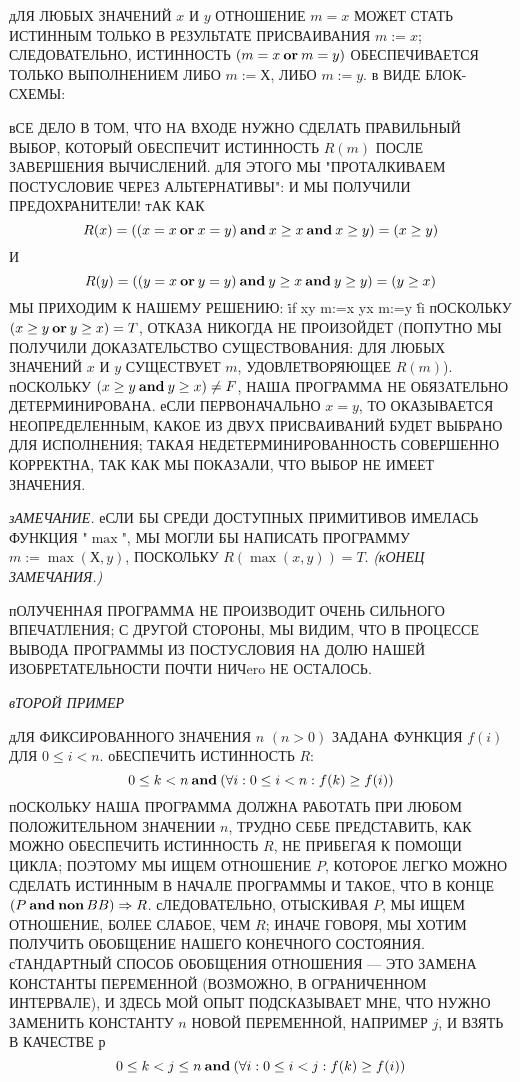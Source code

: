 дЛЯ ЛЮБЫХ ЗНАЧЕНИЙ $x$ И $y$ ОТНОШЕНИЕ $m=x$ МОЖЕТ СТАТЬ ИСТИННЫМ 
ТОЛЬКО В РЕЗУЛЬТАТЕ ПРИСВАИВАНИЯ $m:=x$; СЛЕДОВАТЕЛЬНО, ИСТИННОСТЬ 
$(m=x \mathbin{\bf or} m=y)$ ОБЕСПЕЧИВАЕТСЯ ТОЛЬКО ВЫПОЛНЕНИЕМ ЛИБО $m:=Х$, ЛИБО 
$m:=y$. в ВИДЕ БЛОК-СХЕМЫ:

вСЕ ДЕЛО В ТОМ, ЧТО НА ВХОДЕ НУЖНО СДЕЛАТЬ ПРАВИЛЬНЫЙ ВЫБОР, 
КОТОРЫЙ ОБЕСПЕЧИТ ИСТИННОСТЬ $R(m)$ ПОСЛЕ ЗАВЕРШЕНИЯ ВЫЧИСЛЕНИЙ. 
дЛЯ ЭТОГО МЫ "ПРОТАЛКИВАЕМ ПОСТУСЛОВИЕ ЧЕРЕЗ АЛЬТЕРНАТИВЫ":
И МЫ ПОЛУЧИЛИ ПРЕДОХРАНИТЕЛИ! тАК КАК 
$$ 
R(x) = ((x=x \mathbin{\bf or} x=y) \mathbin{\bf and} x\ge x \mathbin{\bf and} x\ge y) = (x\ge y) 
$$ 
 И
$$ 
R(y)= ((y=x \mathbin{\bf or} y=y) \mathbin{\bf and} y \ge x \mathbin{\bf and} y\ge y) = (y \ge x) 
$$ 
МЫ ПРИХОДИМ К НАШЕМУ РЕШЕНИЮ: 
\prg 
\.{if} x\ge y \to m:=x \wbox y\ge x \to m:=y \.{fi}
\grp
пОСКОЛЬКУ $(x\ge y \mathbin{\bf or} y \ge x)=T$, ОТКАЗА НИКОГДА НЕ ПРОИЗОЙДЕТ 
(ПОПУТНО МЫ ПОЛУЧИЛИ ДОКАЗАТЕЛЬСТВО СУЩЕСТВОВАНИЯ: ДЛЯ ЛЮБЫХ 
ЗНАЧЕНИЙ $x$ И $y$ СУЩЕСТВУЕТ $m$, УДОВЛЕТВОРЯЮЩЕЕ $R(m)$). 
пОСКОЛЬКУ $(x\ge y \mathbin{\bf and} y\ge x)\not=F$, НАША ПРОГРАММА НЕ 
ОБЯЗАТЕЛЬНО ДЕТЕРМИНИРОВАНА. еСЛИ ПЕРВОНАЧАЛЬНО $x=y$, ТО 
ОКАЗЫВАЕТСЯ НЕОПРЕДЕЛЕННЫМ, КАКОЕ ИЗ ДВУХ ПРИСВАИВАНИЙ БУДЕТ 
ВЫБРАНО ДЛЯ ИСПОЛНЕНИЯ; ТАКАЯ НЕДЕТЕРМИНИРОВАННОСТЬ СОВЕРШЕННО 
КОРРЕКТНА, ТАК КАК МЫ ПОКАЗАЛИ, ЧТО ВЫБОР НЕ ИМЕЕТ ЗНАЧЕНИЯ.

{\sl зАМЕЧАНИЕ.} еСЛИ БЫ СРЕДИ ДОСТУПНЫХ ПРИМИТИВОВ ИМЕЛАСЬ ФУНКЦИЯ 
"$\max$", МЫ МОГЛИ БЫ НАПИСАТЬ ПРОГРАММУ $m:=\max(Х,y)$, ПОСКОЛЬКУ 
$R(\max(x,y))=T$. {\sl(кОНЕЦ ЗАМЕЧАНИЯ.)}

пОЛУЧЕННАЯ ПРОГРАММА НЕ ПРОИЗВОДИТ ОЧЕНЬ СИЛЬНОГО ВПЕЧАТЛЕНИЯ; С 
ДРУГОЙ СТОРОНЫ, МЫ ВИДИМ, ЧТО В ПРОЦЕССЕ ВЫВОДА ПРОГРАММЫ ИЗ 
ПОСТУСЛОВИЯ НА ДОЛЮ НАШЕЙ ИЗОБРЕТАТЕЛЬНОСТИ ПОЧТИ НИЧero НЕ 
ОСТАЛОСЬ.

{\sl вТОРОЙ ПРИМЕР}

дЛЯ ФИКСИРОВАННОГО ЗНАЧЕНИЯ $n$ $(n>0)$ ЗАДАНА ФУНКЦИЯ $f(i)$ ДЛЯ 
$0\le i< n$. оБЕСПЕЧИТЬ ИСТИННОСТЬ $R$:
$$
 0 \le k< n \mathbin{\bf and} (\forall i:0 \le i<n:f(k)\ge f(i)) 
$$
пОСКОЛЬКУ НАША ПРОГРАММА ДОЛЖНА РАБОТАТЬ ПРИ ЛЮБОМ  ПОЛОЖИТЕЛЬНОМ 
ЗНАЧЕНИИ $n$, ТРУДНО СЕБЕ ПРЕДСТАВИТЬ, КАК МОЖНО ОБЕСПЕЧИТЬ 
ИСТИННОСТЬ $R$, НЕ ПРИБЕГАЯ К ПОМОЩИ ЦИКЛА; ПОЭТОМУ МЫ ИЩЕМ 
ОТНОШЕНИЕ $P$, КОТОРОЕ ЛЕГКО МОЖНО СДЕЛАТЬ ИСТИННЫМ  В НАЧАЛЕ 
ПРОГРАММЫ И ТАКОЕ, ЧТО В КОНЦЕ $(P \mathbin{\bf and} \mathop{\bf non}\nolimits BB)\Rightarrow R$.  
сЛЕДОВАТЕЛЬНО, ОТЫСКИВАЯ $P$, МЫ ИЩЕМ ОТНОШЕНИЕ, БОЛЕЕ СЛАБОЕ, ЧЕМ 
$R$; ИНАЧЕ ГОВОРЯ, МЫ ХОТИМ ПОЛУЧИТЬ ОБОБЩЕНИЕ НАШЕГО КОНЕЧНОГО 
СОСТОЯНИЯ. сТАНДАРТНЫЙ СПОСОБ ОБОБЩЕНИЯ ОТНОШЕНИЯ --- ЭТО ЗАМЕНА 
КОНСТАНТЫ ПЕРЕМЕННОЙ (ВОЗМОЖНО, В ОГРАНИЧЕННОМ ИНТЕРВАЛЕ), И ЗДЕСЬ 
МОЙ ОПЫТ ПОДСКАЗЫВАЕТ МНЕ, ЧТО НУЖНО  ЗАМЕНИТЬ  КОНСТАНТУ $n$ НОВОЙ 
ПЕРЕМЕННОЙ, НАПРИМЕР $j$, И ВЗЯТЬ В КАЧЕСТВЕ $р$
$$
 0\le k<j\le n \mathbin{\bf and} (\forall i:0\le i<j:f(k)\ge f(i))
$$

